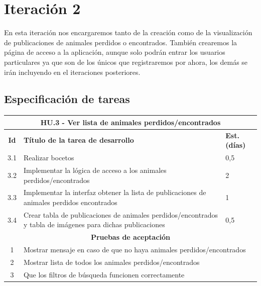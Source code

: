 \section{Iteración 2}
En esta iteración nos encargaremos tanto de la creación como de la visualización de publicaciones de animales perdidos o encontrados. También crearemos la página de acceso a la aplicación, aunque solo podrán entrar los usuarios particulares ya que son de los únicos que registraremos por ahora, los demás se irán incluyendo en el iteraciones posteriores.  \\

\subsection{Especificación de tareas}

\begin{tabular}{|c|p{9.5cm}|p{1cm}|}
	\hline
	\multicolumn{3}{|c|}{\textbf{HU.3 - Ver lista de animales perdidos/encontrados}} \\
	\hline
	\textbf{Id} & \textbf{Título de la tarea de desarrollo} & \textbf{Est. (días)} \\
	\hline
	3.1 & Realizar bocetos & 0,5 \\ \hline
	3.2 &  Implementar la lógica de acceso a los animales perdidos/encontrados& 2 \\ \hline
	3.3 &  Implementar la interfaz obtener la lista de publicaciones de animales perdidos encontrados& 1 \\ \hline
	3.4 & Crear tabla de publicaciones de animales perdidos/encontrados y tabla de imágenes para dichas publicaciones & 0,5\\ \hline
	\multicolumn{3}{|c|}{\textbf{Pruebas de aceptación}} \\ \hline
	1 & \multicolumn{2}{|p{10cm}|}{Mostrar mensaje en caso de que no haya animales perdidos/encontrados} \\ \hline
	2 & \multicolumn{2}{|p{10cm}|}{Mostrar lista de todos los animales perdidos/encontrados} \\ \hline
	3 & \multicolumn{2}{|p{10cm}|}{Que los filtros de búsqueda funcionen correctamente} \\ \hline
\end{tabular} \\ \\


